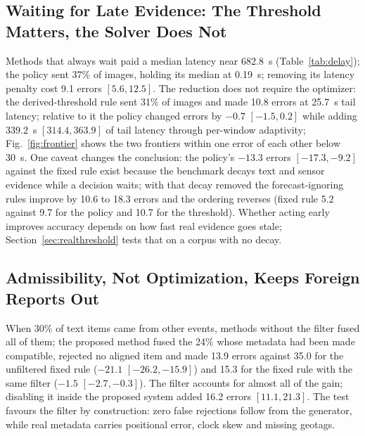 \tablelowbw
\tabledelay

\subsection{Waiting for Late Evidence: The Threshold Matters, the Solver Does Not}
\label{sec:delay}
Methods that always wait paid a median latency near 682.8~s (Table~\ref{tab:delay}); the policy sent 37\% of images, holding its median at 0.19~s; removing its latency penalty cost 9.1 errors $[5.6, 12.5]$. The reduction does not require the optimizer: the derived-threshold rule sent 31\% of images and made 10.8 errors at 25.7~s tail latency; relative to it the policy changed errors by $-0.7$ $[-1.5, 0.2]$ while adding $339.2$~s $[314.4, 363.9]$ of tail latency through per-window adaptivity; Fig.~\ref{fig:frontier} shows the two frontiers within one error of each other below 30~s. One caveat changes the conclusion: the policy's $-13.3$ errors $[-17.3, -9.2]$ against the fixed rule exist because the benchmark decays text and sensor evidence while a decision waits; with that decay removed the forecast-ignoring rules improve by 10.6 to 18.3 errors and the ordering reverses (fixed rule 5.2 against 9.7 for the policy and 10.7 for the threshold). Whether acting early improves accuracy depends on how fast real evidence goes stale; Section~\ref{sec:realthreshold} tests that on a corpus with no decay.

\figfrontier

\subsection{Admissibility, Not Optimization, Keeps Foreign Reports Out}
\label{sec:adm}
When 30\% of text items came from other events, methods without the filter fused all of them; the proposed method fused the 24\% whose metadata had been made compatible, rejected no aligned item and made 13.9 errors against 35.0 for the unfiltered fixed rule ($-21.1$ $[-26.2, -15.9]$) and 15.3 for the fixed rule with the same filter ($-1.5$ $[-2.7, -0.3]$). The filter accounts for almost all of the gain; disabling it inside the proposed system added 16.2 errors $[11.1, 21.3]$. The test favours the filter by construction: zero false rejections follow from the generator, while real metadata carries positional error, clock skew and missing geotags.

